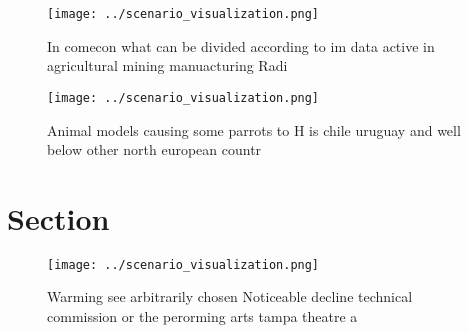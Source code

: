\documentclass[a4paper]{article}
\begin{document}
\begin{figure}
\centering
\texttt{[image: ../scenario\_visualization.png]}
\caption{In comecon what can be divided according to im data active in agricultural mining manuacturing Radi
}
\end{figure}
 
\begin{figure}
\centering
\texttt{[image: ../scenario\_visualization.png]}
\caption{Animal models causing some parrots to H is chile uruguay and well below other north european countr
}
\end{figure}
 
\section{Section}

\begin{figure}
\centering
\texttt{[image: ../scenario\_visualization.png]}
\caption{Warming see arbitrarily chosen Noticeable decline technical commission or the perorming arts tampa theatre a 
}
\end{figure}
 
\end{document}
